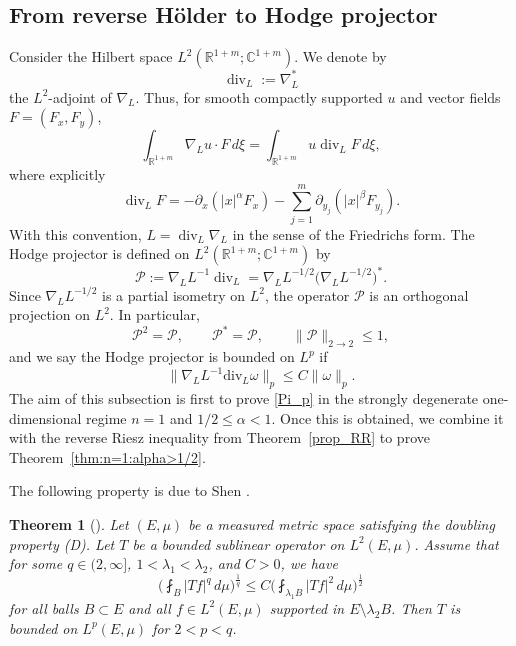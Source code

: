 \documentclass[12pt]{amsart}
\newtheorem{theorem}{Theorem}[section]
\begin{document}
\subsection{From reverse H\"older to Hodge projector}


Consider the Hilbert space $L^2(\mathbb R^{1+m};\mathbb C^{1+m})$. We denote by
\begin{equation*}
    \operatorname{div}_L:=\nabla_L^*
\end{equation*}
the $L^2$-adjoint of $\nabla_L$. Thus, for smooth compactly supported
$u$ and vector fields $F=(F_x,F_y)$,
\begin{equation*}
    \int_{\mathbb R^{1+m}}
     \nabla_Lu \cdot F \, d\xi =
    \int_{\mathbb R^{1+m}}
    u \operatorname{div}_L F \, d\xi ,
\end{equation*}
where explicitly
\begin{equation*}
\operatorname{div}_L F = -\partial_x(|x|^\alpha F_x) - \sum_{j=1}^m\partial_{y_j}(|x|^\beta F_{y_j}).
\end{equation*}
With this convention, $L=\operatorname{div}_L\nabla_L$ in the sense of the Friedrichs form. The Hodge projector is defined on $L^2(\mathbb{R}^{1+m}; \mathbb{C}^{1+m})$ by
\begin{equation*}
   \mathcal P:=\nabla_L L^{-1}\operatorname{div}_L =  \nabla_L L^{-1/2} \bigl(\nabla_L L^{-1/2}\bigr)^*.
\end{equation*}
Since $\nabla_L L^{-1/2}$ is a partial isometry on $L^2$, the operator $\mathcal P$ is an orthogonal projection on $L^2$. In particular,
\begin{equation*}
    \mathcal P^2= \mathcal P,\qquad \mathcal P^*= \mathcal P,\qquad \|\mathcal P\|_{2\to2}\le 1,
\end{equation*}
and we say the Hodge projector is bounded on $L^p$ if
\begin{equation}\label{Pi_p}\tag{$\Pi_p$}
    \| \nabla_L L^{-1} \mathrm{div}_L \omega \|_p \le C \| \omega \|_p.
\end{equation}
The aim of this subsection is first to prove \eqref{Pi_p} in the strongly degenerate one-dimensional regime $n=1$ and $1/2 \le \alpha <1$. Once this is obtained, we combine it with the reverse Riesz inequality from
Theorem~\ref{prop_RR} to prove Theorem~\ref{thm:n=1:alpha>1/2}.

The following property is due to Shen \cite{Shen}.

\begin{theorem}[{\cite{Shen}}]\label{thm:Shen}
Let $(E,\mu)$ be a measured metric space satisfying the doubling property (D). Let $T$ be a bounded sublinear operator on $L^2(E,\mu)$. Assume that for some $q\in (2,\infty]$, $1<\lambda_1<\lambda_2$, and $C>0$, we have
\begin{equation}\label{eq:Shen}
    \biggl( \fint_B |Tf|^q \, d\mu \biggr)^{\!\frac{1}{q}} \le C \biggl( \fint_{\lambda_1 B} |Tf|^2 \, d\mu \biggr)^{\!\frac{1}{2}}
\end{equation}
for all balls $B \subset E$ and all $f\in L^2(E,\mu)$ supported in $E\setminus \lambda_2 B$. Then $T$ is bounded on $L^p(E,\mu)$ for $2<p<q$.  
\end{theorem}
\end{document}
